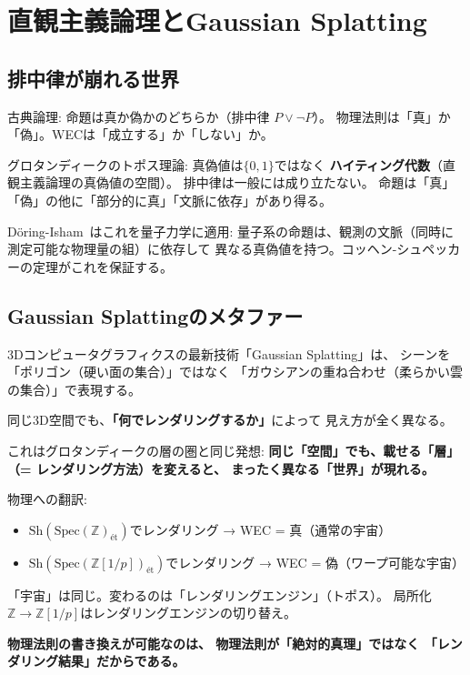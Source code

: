 \documentclass[11pt,a4paper]{article}
\newcommand{\Spec}{\mathrm{Spec}}
\newcommand{\Sh}{\mathrm{Sh}}
\newcommand{\Zp}{\mathbb{Z}[1/p]}
\begin{document}
\section{直観主義論理とGaussian Splatting}

\subsection{排中律が崩れる世界}

古典論理: 命題は真か偽かのどちらか（排中律 $P \lor \neg P$）。
物理法則は「真」か「偽」。WECは「成立する」か「しない」か。

グロタンディークのトポス理論: 真偽値は$\{0, 1\}$ではなく
\textbf{ハイティング代数}（直観主義論理の真偽値の空間）。
排中律は一般には成り立たない。
命題は「真」「偽」の他に「部分的に真」「文脈に依存」があり得る。

Döring-Isham~\cite{DoeringIsham2008}はこれを量子力学に適用:
量子系の命題は、観測の文脈（同時に測定可能な物理量の組）に依存して
異なる真偽値を持つ。コッヘン-シュペッカーの定理がこれを保証する。

\subsection{Gaussian Splattingのメタファー}

\begin{epigraph}
3Dコンピュータグラフィクスの最新技術「Gaussian Splatting」は、
シーンを「ポリゴン（硬い面の集合）」ではなく
「ガウシアンの重ね合わせ（柔らかい雲の集合）」で表現する。

同じ3D空間でも、\textbf{「何でレンダリングするか」}によって
見え方が全く異なる。

これはグロタンディークの層の圏と同じ発想:
\textbf{同じ「空間」でも、載せる「層」（= レンダリング方法）を変えると、
まったく異なる「世界」が現れる。}
\end{epigraph}

物理への翻訳:
\begin{itemize}
\item $\Sh(\Spec(\mathbb{Z})_{\text{ét}})$でレンダリング → WEC = 真（通常の宇宙）
\item $\Sh(\Spec(\Zp)_{\text{ét}})$でレンダリング → WEC = 偽（ワープ可能な宇宙）
\end{itemize}

「宇宙」は同じ。変わるのは「レンダリングエンジン」（トポス）。
局所化$\mathbb{Z} \to \Zp$はレンダリングエンジンの切り替え。

\textbf{物理法則の書き換えが可能なのは、
物理法則が「絶対的真理」ではなく
「レンダリング結果」だからである。}
\end{document}

